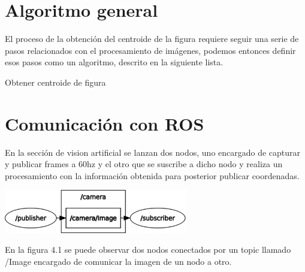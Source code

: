 
\section{Algoritmo general}
El proceso de la obtención del centroide de la figura requiere seguir una serie de pasos relacionados con el
procesamiento de imágenes, podemos entonces definir esos pasos como un algoritmo, descrito en la siguiente lista.

\begin{algorithm}
	\caption{Obtener centroide de figura}
	\begin{algorithmic}[1]
	\end{algorithmic}
\end{algorithm}




\section{Comunicación con ROS}
En la sección de vision artificial se lanzan dos nodos, uno encargado de capturar y
publicar frames a 60hz y el otro que se suscribe a dicho nodo y realiza un procesamiento
con la información obtenida para posterior publicar coordenadas.
\begin{center}
	\includegraphics[width=0.6\textwidth]{Contenido/Cuerpo/Capitulo4/Fig0.eps}
	\label{Fig1}
\end{center}
En la figura 4.1 se puede observar dos nodos conectados por un topic llamado /Image
encargado de comunicar la imagen de un nodo a otro.
